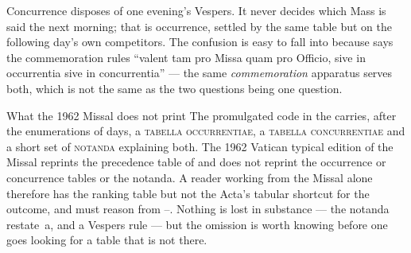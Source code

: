 Concurrence disposes of one evening's Vespers. It never decides which Mass is
said the next morning; that is occurrence, settled by the same table but on
the following day's own competitors. The confusion is easy to fall into
because  says the commemoration rules ``valent tam pro Missa quam pro
Officio, sive in occurrentia sive in concurrentia'' --- the same
\emph{commemoration} apparatus serves both, which is not the same as the two
questions being one question.

\begin{caution}{What the 1962 Missal does not print}
The promulgated code in the  carries, after the enumerations of
days, a \textsc{tabella occurrentiae}, a \textsc{tabella concurrentiae} and a
short set of \textsc{notanda} explaining both. The 1962 Vatican typical
edition of the Missal reprints the precedence table of  and does not
reprint the occurrence or concurrence tables or the notanda. A reader working
from the Missal alone therefore has the ranking table but not the
Acta's tabular shortcut for the outcome, and must reason from
--. Nothing is lost in substance --- the notanda restate
\,a,  and a Vespers rule --- but the omission is worth knowing
before one goes looking for a table that is not there.
\end{caution}
